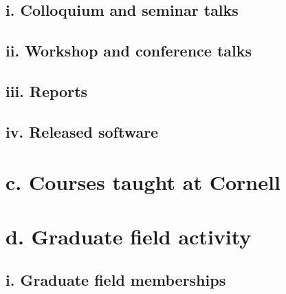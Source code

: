 \documentclass{article}
\begin{document}
\subsection*{i. Colloquium and seminar talks}



\subsection*{ii. Workshop and conference talks}



\subsection*{iii. Reports}



\subsection*{iv. Released software}




\section*{c. Courses taught at Cornell}



%
%

\section*{d. Graduate field activity}

\subsection*{i. Graduate field memberships}
\end{document}
